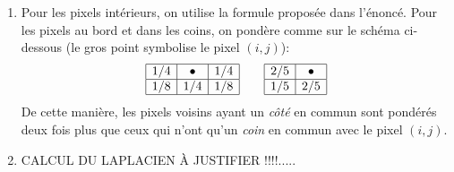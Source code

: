 \begin{enumerate}[questions]
\item Pour les pixels intérieurs, on utilise la formule proposée dans l'énoncé. Pour les pixels au bord et dans les coins, on pondère comme sur le schéma ci-dessous (le gros point symbolise le pixel $(i,j)$):
	\[ 
		\begin{array}{|c|c|c|}
		\hline
		1/4 & \bullet & 1/4 \\
		\hline
		1/8 & 1/4 & 1/8 \\
		\hline
		\end{array} 
		\qquad
		\begin{array}{|c|c|}
		\hline
		2/5 & \bullet \\
		\hline
		1/5 & 2/5 \\
		\hline
		\end{array}
	\]
De cette manière, les pixels voisins ayant un \emph{côté} en commun sont pondérés deux fois plus que ceux qui n'ont qu'un \emph{coin} en commun avec le pixel $(i,j)$.

\item CALCUL DU LAPLACIEN À JUSTIFIER !!!!.....
\end{enumerate}